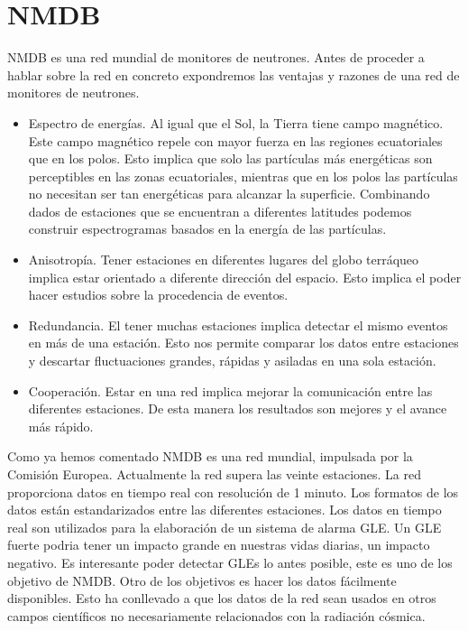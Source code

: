 \section{NMDB}
	NMDB\cite{NMDB2011} es una red mundial de monitores de neutrones. Antes de proceder a hablar sobre la red en concreto expondremos las ventajas
	y razones de una red de monitores de neutrones.
	\begin{itemize}
		\item 	Espectro de energías. Al igual que el Sol, la Tierra tiene campo magnético. Este campo magnético repele con mayor fuerza en
		  	las regiones ecuatoriales que en los polos. Esto implica que solo las partículas más energéticas son perceptibles en las
			zonas ecuatoriales, mientras que en los polos las partículas no necesitan ser tan energéticas para alcanzar la superficie.
			Combinando dados de estaciones que se encuentran a diferentes latitudes podemos construir espectrogramas basados en la energía
			de las partículas.
		\item 	Anisotropía. Tener estaciones en diferentes lugares del globo terráqueo implica estar orientado a diferente dirección del
		  	espacio. Esto implica el poder hacer estudios sobre la procedencia de eventos.
		\item 	Redundancia. El tener muchas estaciones implica detectar el mismo eventos en más de una estación. Esto nos permite comparar
		  	los datos entre estaciones y descartar fluctuaciones grandes, rápidas y asiladas en una sola estación.
		\item 	Cooperación. Estar en una red implica mejorar la comunicación entre las diferentes estaciones. De esta manera los resultados
		  	son mejores y el avance más rápido. 
	\end{itemize}
	Como ya hemos comentado NMDB es una red mundial, impulsada por la Comisión Europea. Actualmente la red supera las veinte estaciones. La red 
	proporciona datos en tiempo real con resolución de 1 minuto. Los formatos de los datos están estandarizados entre las diferentes estaciones.
	Los datos en tiempo real son utilizados para la elaboración de un sistema de alarma GLE\cite{GleAlarm}. Un GLE fuerte podria tener un impacto grande en
	nuestras vidas diarias, un impacto negativo. Es interesante poder detectar GLEs lo antes posible, este es uno de los objetivo de NMDB.
	Otro de los objetivos es hacer los datos fácilmente disponibles. Esto ha conllevado a que los datos de la red sean usados en otros campos 
	científicos no necesariamente relacionados con la radiación cósmica. 

